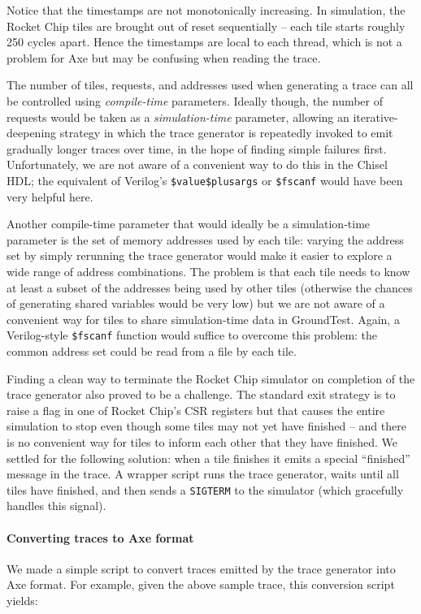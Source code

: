 \documentclass[11pt]{article}
\begin{document}
Notice that the timestamps are not monotonically increasing.  In
simulation, the Rocket Chip tiles are brought out of reset
sequentially -- each tile starts roughly 250 cycles apart.  Hence the
timestamps are local to each thread, which is not a problem for Axe
but may be confusing when reading the trace.

The number of tiles, requests, and addresses used when generating a
trace can all be controlled using \emph{compile-time} parameters.
Ideally though, the number of requests would be taken as a
\emph{simulation-time} parameter, allowing an iterative-deepening
strategy in which the trace generator is repeatedly invoked to emit
gradually longer traces over time, in the hope of finding simple
failures first.  Unfortunately, we are not aware of a convenient way
to do this in the Chisel HDL; the equivalent of Verilog's
\verb!$value$plusargs! or \verb!$fscanf! would have been very helpful
here.

Another compile-time parameter that would ideally be a simulation-time
parameter is the set of memory addresses used by each tile: varying
the address set by simply rerunning the trace generator would make it
easier to explore a wide range of address combinations.  The problem
is that each tile needs to know at least a subset of the addresses
being used by other tiles (otherwise the chances of generating shared
variables would be very low) but we are not aware of a convenient way
for tiles to share simulation-time data in GroundTest.  Again, a
Verilog-style \verb!$fscanf! function would suffice to overcome this
problem: the common address set could be read from a file by each
tile.

Finding a clean way to terminate the Rocket Chip simulator on
completion of the trace generator also proved to be a challenge.  The
standard exit strategy is to raise a flag in one of Rocket Chip's CSR
registers but that causes the entire simulation to stop even though
some tiles may not yet have finished -- and there is no convenient way
for tiles to inform each other that they have finished.  We settled
for the following solution: when a tile finishes it emits a special
``finished'' message in the trace.  A wrapper script runs the trace
generator, waits until all tiles have finished, and then sends a
\verb!SIGTERM! to the simulator (which gracefully handles this
signal).

\paragraph{Converting traces to Axe format} We made a simple script to
convert traces emitted by the trace generator into Axe format.  For
example, given the above sample trace, this conversion script yields:
\end{document}
